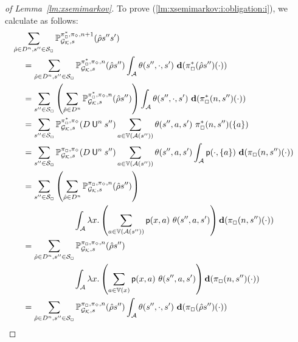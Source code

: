 \begin{proof}[of Lemma~\ref{lm:xsemimarkov}]
  To prove (\ref{lm:xsemimarkov:i:obligation:i}), we calculate as
  follows:
  \begin{align}
    \sum_{\hat{\rho}\in D^n,s''\in\sgnmax}\Prob^{\starredstrat_{\maxplay},\strat_{\minplay},n+1}_{\StochGK,s}(\hat{\rho}s''s')
    \hspace{-11.4em}\notag\\
    & =
    \sum_{\hat{\rho}\in D^n,s''\in\sgnmax}\Prob^{\starredstrat_{\maxplay},\strat_{\minplay},n}_{\StochGK,s}(\hat{\rho}s'')\int_{\sgactions}\sgtrans(s'',\cdot,s')\ \diff(\starredstrat_{\maxplay}(\hat{\rho}s'')(\cdot))
    \label{eq:xsemimarkov:i:obligation:i:proof:i} \\
    & =
    \sum_{s''\in\sgnmax}\left(\sum_{\hat{\rho}\in D^n}\Prob^{\starredstrat_{\maxplay},\strat_{\minplay},n}_{\StochGK,s}(\hat{\rho}s'')\right)\int_{\sgactions}\sgtrans(s'',\cdot,s')\ \diff(\starredstrat_{\maxplay}(n,s'')(\cdot))
    \label{eq:xsemimarkov:i:obligation:i:proof:ii} \\
    & =
    \sum_{s''\in\sgnmax}\Prob^{\starredstrat_{\maxplay},\strat_{\minplay}}_{\StochGK,s}(D \Until^n s'')\sum_{a\in\vertices(\enabled(s''))}\sgtrans(s'',a,s')\mult\starredstrat_{\maxplay}(n,s'')(\{a\})
    \label{eq:xsemimarkov:i:obligation:i:proof:iii} \\
    & =
    \sum_{s''\in\sgnmax}\Prob^{\strat_{\maxplay},\strat_{\minplay}}_{\StochGK,s}(D \Until^n s'')\sum_{a\in\vertices(\enabled(s''))}\sgtrans(s'',a,s')\int_{\sgactions} \convp(\cdot,\{a\})\ \diff(\strat_\maxplay(n,s'')(\cdot))
    \label{eq:xsemimarkov:i:obligation:i:proof:iv} \\
    & =
    \sum_{s''\in\sgnmax}\left(\sum_{\hat{\rho}\in D^n}\Prob^{\strat_{\maxplay},\strat_{\minplay},n}_{\StochGK,s}(\hat{\rho}s'')\right)
    \notag\\
    &\qquad\qquad\qquad
    \int_{\sgactions} \lambda x.\left(\sum_{a\in\vertices(\enabled(s''))}\convp(x,a)\mult\sgtrans(s'',a,s')\right) \diff(\strat_\maxplay(n,s'')(\cdot))
    \label{eq:xsemimarkov:i:obligation:i:proof:v} \\
    & =
    \sum_{\hat{\rho}\in D^n,s''\in\sgnmax}\Prob^{\strat_{\maxplay},\strat_{\minplay},n}_{\StochGK,s}(\hat{\rho}s'')
    \notag\\
    &\qquad\qquad\qquad 
    \int_{\sgactions} \lambda x.\left(\sum_{a\in\vertices(x)}\convp(x,a)\mult\sgtrans(s'',a,s')\right) \diff(\strat_\maxplay(n,s'')(\cdot))
    \label{eq:xsemimarkov:i:obligation:i:proof:vi} \\
    & =
    \sum_{\hat{\rho}\in D^n,s''\in\sgnmax}\Prob^{\strat_{\maxplay},\strat_{\minplay},n}_{\StochGK,s}(\hat{\rho}s'') \int_{\sgactions} \sgtrans(s'',\cdot,s')\ \diff(\strat_\maxplay(\hat{\rho}s'')(\cdot))

\end{align}
\end{proof}
